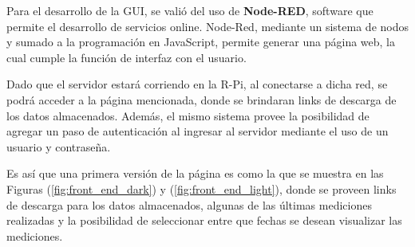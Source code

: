 Para el desarrollo de la GUI, se valió del uso de \textbf{Node-RED}, software que permite el desarrollo de servicios online. Node-Red, mediante un sistema de nodos y sumado a la programación en JavaScript, permite generar una página web, la cual cumple la función de interfaz con el usuario.

Dado que el servidor estará corriendo en la R-Pi, al conectarse a dicha red, se podrá acceder a la página mencionada, donde se brindaran links de descarga de los datos almacenados. Además, el mismo sistema provee la posibilidad de agregar un paso de autenticación al ingresar al servidor mediante el uso de un usuario y contraseña. 

Es así que una primera versión de la página es como la que se muestra en las Figuras (\ref{fig:front_end_dark}) y (\ref{fig:front_end_light}), donde se proveen links de descarga para los datos almacenados, algunas de las últimas mediciones realizadas y la posibilidad de seleccionar entre que fechas se desean visualizar las mediciones.

